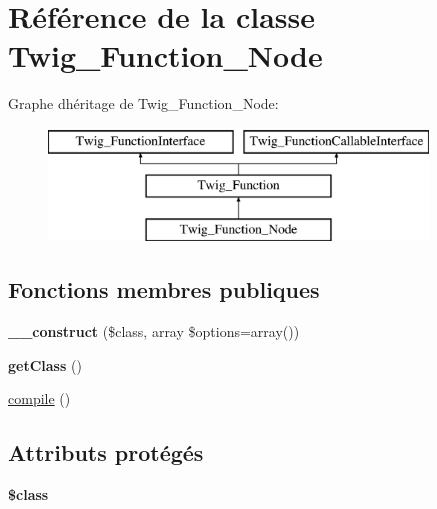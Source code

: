 \hypertarget{class_twig___function___node}{}\section{Référence de la classe Twig\+\_\+\+Function\+\_\+\+Node}
\label{class_twig___function___node}
Graphe d\textquotesingle{}héritage de Twig\+\_\+\+Function\+\_\+\+Node\+:\begin{figure}[H]
\begin{center}
\leavevmode
\includegraphics[height=3.000000cm]{class_twig___function___node}
\end{center}
\end{figure}
\subsection*{Fonctions membres publiques}
\begin{DoxyCompactItemize}
\item 
{\bfseries \+\_\+\+\_\+construct} (\$class, array \$options=array())\hypertarget{class_twig___function___node_ad54af67e0f4e88a0c80d60b51380a48e}{}\label{class_twig___function___node_ad54af67e0f4e88a0c80d60b51380a48e}

\item 
{\bfseries get\+Class} ()\hypertarget{class_twig___function___node_a23ecbde357f7f6bde5a50f876334a74d}{}\label{class_twig___function___node_a23ecbde357f7f6bde5a50f876334a74d}

\item 
\hyperlink{class_twig___function___node_a3815e7c2e73f00c2ebffcf5b90eef3b1}{compile} ()
\end{DoxyCompactItemize}
\subsection*{Attributs protégés}
\begin{DoxyCompactItemize}
\item 
{\bfseries \$class}\hypertarget{class_twig___function___node_a252ba022809910ea710a068fc1bab657}{}\label{class_twig___function___node_a252ba022809910ea710a068fc1bab657}

\end{DoxyCompactItemize}


